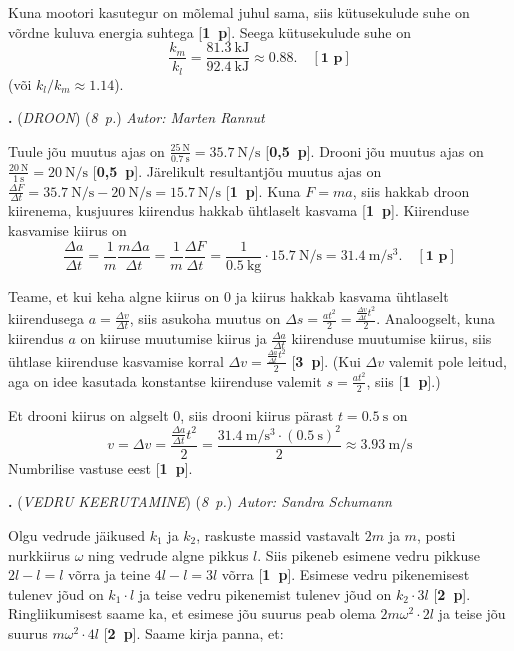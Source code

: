 \documentclass[11pt,a5paper]{article}
\newcommand{\numb}[1]{\vspace{5pt}\textbf{\large #1}}
\newcommand{\nimi}[1]{(\textsl{\small #1})}
\newcommand{\punktid}[1]{(\emph{#1~p.})}
\newcommand{\p}[1]{[\textbf{#1~p}]}
\newcounter{ylesanne}
\newcommand{\yl}[1]{\addtocounter{ylesanne}{1}\numb{\theylesanne.} \nimi{#1} \newblock{}}
\newcommand{\autor}[1]{\emph{Autor: #1}}%
\begin{document}
Kuna mootori kasutegur on mõlemal juhul sama, siis kütusekulude suhe on võrdne kuluva energia suhtega \p{1}. Seega kütusekulude suhe on
\begin{equation*}
    \frac{k_m}{k_l} = \frac{\SI{81.3}{\kJ}}{\SI{92.4}{\kJ}} \approx \num{0.88}. \quad\p{1}
\end{equation*}
(või $k_l/k_m \approx \num{1.14}$).

\yl{DROON}
\punktid{8} \autor{Marten Rannut}

Tuule jõu muutus ajas on $\frac{\SI{25}{\N}}{\SI{0.7}{\s}} = \SI{35.7}{\N\per\s}$ \p{0,5}. Drooni jõu muutus ajas on $\frac{\SI{20}{\N}}{\SI{1}{\s}} = \SI{20}{\N\per\s}$ \p{0,5}. Järelikult resultantjõu muutus ajas on $\frac{\Delta F}{\Delta t} = \SI{35.7}{\N\per\s}-\SI{20}{\N\per\s}=\SI{15.7}{\N\per\s}$ \p{1}. Kuna $F=ma$, siis hakkab droon kiirenema, kusjuures kiirendus hakkab ühtlaselt kasvama \p{1}. Kiirenduse kasvamise kiirus on
\begin{equation*}
    \frac{\Delta a}{\Delta t} = \frac{1}{m}\frac{m\Delta a}{\Delta t} = \frac{1}{m}\frac{\Delta F}{\Delta t} = \frac{1}{\SI{0.5}{\kg}}\cdot \SI{15.7}{\N\per\s} = \SI{31.4}{\m\per\s\cubed}. \quad \p{1}
\end{equation*}

Teame, et kui keha algne kiirus on 0 ja kiirus hakkab kasvama ühtlaselt kiirendusega $a = \frac{\Delta v}{\Delta t}$, siis asukoha muutus on $\Delta s = \frac{at^2}{2} = \frac{\frac{\Delta v}{\Delta t}t^2}{2}$. Analoogselt, kuna kiirendus $a$ on kiiruse muutumise kiirus ja $\frac{\Delta a}{\Delta t}$ kiirenduse muutumise kiirus, siis ühtlase kiirenduse kasvamise korral $\Delta v = \frac{\frac{\Delta a}{\Delta t}t^2}{2}$ \p{3}. (Kui $\Delta v$ valemit pole leitud, aga on idee kasutada konstantse kiirenduse valemit $s = \frac{at^2}{2}$, siis \p{1}.)

Et drooni kiirus on algselt 0, siis drooni kiirus pärast $t=\SI{0.5}{\s}$ on
\begin{equation*}
    v = \Delta v = \frac{\frac{\Delta a}{\Delta t}t^2}{2} = \frac{\SI{31.4}{\m\per\s\cubed}\cdot (\SI{0.5}{\s})^2}{2} \approx \SI{3.93}{\m\per\s}
\end{equation*}
Numbrilise vastuse eest \p{1}.

\yl{VEDRU KEERUTAMINE}
\punktid{8} \autor{Sandra Schumann}

Olgu vedrude jäikused $k_1$ ja $k_2$, raskuste massid vastavalt $2m$ ja $m$, posti nurkkiirus $\omega$ ning vedrude algne pikkus $l$. Siis pikeneb esimene vedru pikkuse $2l - l = l$ võrra ja teine $4l - l = 3l$ võrra \p{1}. Esimese vedru pikenemisest tulenev jõud on $k_1 \cdot l$ ja teise vedru pikenemist tulenev jõud on $k_2 \cdot 3l$ \p{2}. Ringliikumisest saame ka, et esimese jõu suurus peab olema $2m \omega^2 \cdot 2l$ ja teise jõu suurus $m \omega^2 \cdot 4l$ \p{2}. Saame kirja panna, et:
\end{document}
